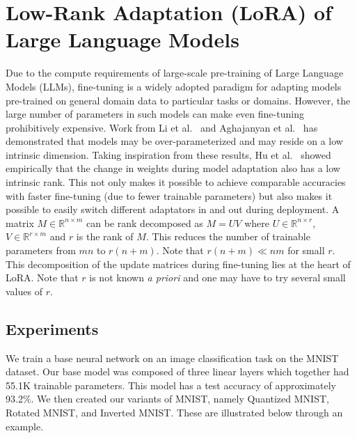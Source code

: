 \documentclass{article}
\newcommand{\R}{\mathbb{R}}
\begin{document}
\label{gen_inst}


\section{Low-Rank Adaptation (LoRA) of Large Language Models}
Due to the compute requirements of large-scale pre-training of Large Language Models (LLMs), fine-tuning is a widely adopted paradigm for adapting models pre-trained on general domain data to particular tasks or domains. However, the large number of parameters in such models can make even fine-tuning prohibitively expensive. Work from Li et al.~\cite{li2018measuring} and Aghajanyan et al.~\cite{aghajanyan2020intrinsic} has demonstrated that models may be over-parameterized and may reside on a low intrinsic dimension. Taking inspiration from these results, Hu et al.~\cite{hu2022lora} showed empirically that the change in weights during model adaptation also has a low intrinsic rank. This not only makes it possible to achieve comparable accuracies with faster fine-tuning (due to fewer trainable parameters) but also makes it possible to easily switch different adaptators in and out during deployment. A matrix $M \in \R^{n \times m}$ can be rank decomposed as $M = UV$ where $U \in \R^{n \times r}$, $V \in \R^{r \times m}$ and $r$ is the rank of $M$. This reduces the number of trainable parameters from $mn$ to $r(n + m)$. Note that $r(n + m) \ll nm$ for small $r$. This decomposition of the update matrices during fine-tuning lies at the heart of LoRA. Note that $r$ is not known \textit{a priori} and one may have to try several small values of $r$.

\subsection{Experiments}
We train a base neural network on an image classification task on the MNIST dataset. Our base model was composed of three linear layers which together had 55.1K trainable parameters. This model has a test accuracy of approximately 93.2\%. We then created our variants of MNIST, namely Quantized MNIST, Rotated MNIST, and Inverted MNIST. These are illustrated below through an example.
\end{document}

